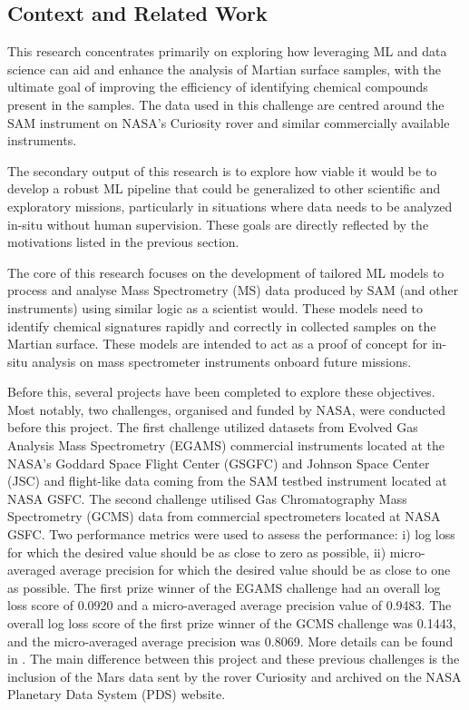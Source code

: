 \subsection{Context and Related Work}

This research concentrates primarily on exploring how leveraging ML and data science can aid and enhance the analysis of Martian surface samples, with the ultimate goal of improving the efficiency of identifying chemical compounds present in the samples. The data used in this challenge are centred around the SAM instrument on NASA’s Curiosity rover and similar commercially available instruments.

The secondary output of this research is to explore how viable it would be to develop a robust ML pipeline that could be generalized to other scientific and exploratory missions, particularly in situations where data needs to be analyzed in-situ without human supervision. These goals are directly reflected by the motivations listed in the previous section.

The core of this research focuses on the development of tailored ML models to process and analyse Mass Spectrometry (MS) data produced by SAM (and other instruments) using similar logic as a scientist would. These models need to identify chemical signatures rapidly and correctly in collected samples on the Martian surface. These models are intended to act as a proof of concept for in-situ analysis on mass spectrometer instruments onboard future missions.

Before this, several projects have been completed to explore these objectives. Most notably, two challenges, organised and funded by NASA, were conducted before this project. The first challenge utilized datasets from Evolved Gas Analysis Mass Spectrometry (EGAMS) commercial instruments located at the NASA’s Goddard Space Flight Center (GSGFC) and Johnson Space Center (JSC) and flight-like data coming from the SAM testbed instrument located at NASA GSFC. The second challenge utilised Gas Chromatography Mass Spectrometry (GCMS) data from commercial spectrometers located at NASA GSFC. Two performance metrics were used to assess the performance: i) log loss for which the desired value should be as close to zero as possible, ii) micro-averaged average precision for which the desired value should be as close to one as possible. The first prize winner of the EGAMS challenge had an overall log loss score of 0.0920 and a micro-averaged average precision value of 0.9483. The overall log loss score of the first prize winner of the GCMS challenge was 0.1443, and the micro-averaged average precision was 0.8069. More details can be found in  \cite{da2024leveraging}. The main difference between this project and these previous challenges is the inclusion of the Mars data sent by the rover Curiosity and archived on the NASA Planetary Data System (PDS) website.

